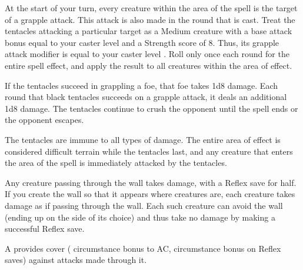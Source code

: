 \spellrng{\rngmed}
\begin{spelleffect}
  At the start of your turn, every creature within the area of the spell is the target of a grapple attack. This attack is also made in the round that  is cast. Treat the tentacles attacking a particular target as a Medium creature with a base attack bonus equal to your caster level and a Strength score of 8. Thus, its grapple attack modifier is equal to your caster level . Roll only once each round for the entire spell effect, and apply the result to all creatures within the area of effect.
  \par If the tentacles succeed in grappling a foe, that foe takes 1d8 damage. Each round that black tentacles succeeds on a grapple attack, it deals an additional 1d8 damage. The tentacles continue to crush the opponent until the spell ends or the opponent escapes.
  \par The tentacles are immune to all types of damage. The entire area of effect is considered difficult terrain while the tentacles last, and any creature that enters the area of the spell is immediately attacked by the tentacles.
\end{spelleffect}

\spellrng{\rngmed}
\begin{spelleffect}
  Any creature passing through the wall takes damage, with a Reflex save for half. If you create the wall so that it appears where creatures are, each creature takes damage as if passing through the wall. Each such creature can avoid the wall (ending up on the side of its choice) and thus take no damage by making a successful Reflex save.
  \par A  provides cover ( circumstance bonus to AC,  circumstance bonus on Reflex saves) against attacks made through it.
\end{spelleffect}

